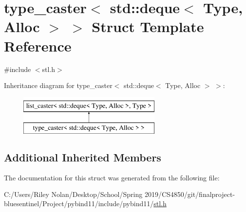\hypertarget{structtype__caster_3_01std_1_1deque_3_01_type_00_01_alloc_01_4_01_4}{}\section{type\+\_\+caster$<$ std\+::deque$<$ Type, Alloc $>$ $>$ Struct Template Reference}
\label{structtype__caster_3_01std_1_1deque_3_01_type_00_01_alloc_01_4_01_4}


{\ttfamily \#include $<$stl.\+h$>$}

Inheritance diagram for type\+\_\+caster$<$ std\+::deque$<$ Type, Alloc $>$ $>$\+:\begin{figure}[H]
\begin{center}
\leavevmode
\includegraphics[height=2.000000cm]{structtype__caster_3_01std_1_1deque_3_01_type_00_01_alloc_01_4_01_4}
\end{center}
\end{figure}
\subsection*{Additional Inherited Members}


The documentation for this struct was generated from the following file\+:\begin{DoxyCompactItemize}
\item 
C\+:/\+Users/\+Riley Nolan/\+Desktop/\+School/\+Spring 2019/\+C\+S4850/git/finalproject-\/bluesentinel/\+Project/pybind11/include/pybind11/\mbox{\hyperlink{stl_8h}{stl.\+h}}\end{DoxyCompactItemize}
